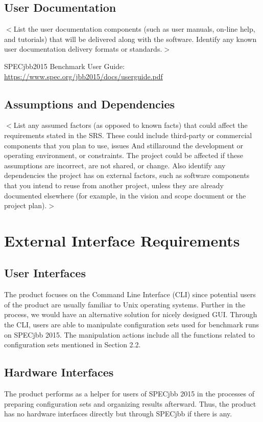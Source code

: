 \documentclass{scrreprt}
\begin{document}
\section{User Documentation}
$<$List the user documentation components (such as user manuals, on-line help, and tutorials) that will be delivered along with the software. Identify any known user documentation delivery formats or standards.$>$

SPECjbb2015 Benchmark User Guide: \hyperlink{https://www.spec.org/jbb2015/docs/userguide.pdf}{https://www.spec.org/jbb2015/docs/userguide.pdf}

\section{Assumptions and Dependencies}
$<$List any assumed factors (as opposed to known facts) that could affect the 
requirements stated in the SRS. These could include third-party or commercial 
components that you plan to use, issues And stillaround the development or operating 
environment, or constraints. The project could be affected if these assumptions 
are incorrect, are not shared, or change. Also identify any dependencies the 
project has on external factors, such as software components that you intend to 
reuse from another project, unless they are already documented elsewhere (for 
example, in the vision and scope document or the project plan).$>$


\chapter{External Interface Requirements}

\section{User Interfaces}
The product focuses on the Command Line Interface (CLI) since potential users of the product are usually familiar to Unix operating systems. Further in the process, we would have an alternative solution for nicely designed GUI. Through the CLI, users are able to manipulate configuration sets used for benchmark runs on SPECjbb 2015. The manipulation actions include all the functions related to configuration sets mentioned in Section 2.2.

\section{Hardware Interfaces}
The product performs as a helper for users of SPECjbb 2015 in the processes of preparing configuration sets and organizing results afterward. Thus, the product has no hardware interfaces directly but through SPECjbb if there is any.
\end{document}
